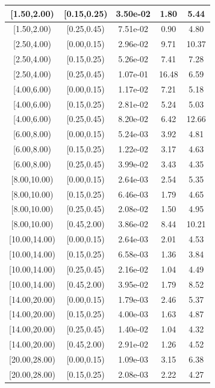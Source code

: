 \documentclass[%
aps, prd, reprint, show pacs, preprint numbers, ams math, amssymb, superscriptaddress, linenumbers]{revtex4-1}
\begin{document}
\begin{table}
\begin{tabular}{|c|c|c|c|c|}
 \hline
[1.50,2.00) & [0.15,0.25) & 3.50e-02 & 1.80 & 5.44 \\ 
 \hline
[1.50,2.00) & [0.25,0.45) & 7.51e-02 & 0.90 & 4.80 \\ 
 \hline
[2.50,4.00) & [0.00,0.15) & 2.96e-02 & 9.71 & 10.37 \\ 
 \hline
[2.50,4.00) & [0.15,0.25) & 5.26e-02 & 7.41 & 7.28 \\ 
 \hline
[2.50,4.00) & [0.25,0.45) & 1.07e-01 & 16.48 & 6.59 \\ 
 \hline
[4.00,6.00) & [0.00,0.15) & 1.17e-02 & 7.21 & 5.18 \\ 
 \hline
[4.00,6.00) & [0.15,0.25) & 2.81e-02 & 5.24 & 5.03 \\ 
 \hline
[4.00,6.00) & [0.25,0.45) & 8.20e-02 & 6.42 & 12.66 \\ 
 \hline
[6.00,8.00) & [0.00,0.15) & 5.24e-03 & 3.92 & 4.81 \\ 
 \hline
[6.00,8.00) & [0.15,0.25) & 1.22e-02 & 3.17 & 4.63 \\ 
 \hline
[6.00,8.00) & [0.25,0.45) & 3.99e-02 & 3.43 & 4.35 \\ 
 \hline
[8.00,10.00) & [0.00,0.15) & 2.64e-03 & 2.54 & 5.35 \\ 
 \hline
[8.00,10.00) & [0.15,0.25) & 6.46e-03 & 1.79 & 4.65 \\ 
 \hline
[8.00,10.00) & [0.25,0.45) & 2.08e-02 & 1.50 & 4.95 \\ 
 \hline
[8.00,10.00) & [0.45,2.00) & 3.86e-02 & 8.44 & 10.21 \\ 
 \hline
[10.00,14.00) & [0.00,0.15) & 2.64e-03 & 2.01 & 4.53 \\ 
 \hline
[10.00,14.00) & [0.15,0.25) & 6.58e-03 & 1.36 & 3.84 \\ 
 \hline
[10.00,14.00) & [0.25,0.45) & 2.16e-02 & 1.04 & 4.49 \\ 
 \hline
[10.00,14.00) & [0.45,2.00) & 3.95e-02 & 1.79 & 8.52 \\ 
 \hline
[14.00,20.00) & [0.00,0.15) & 1.79e-03 & 2.46 & 5.37 \\ 
 \hline
[14.00,20.00) & [0.15,0.25) & 4.00e-03 & 1.63 & 4.87 \\ 
 \hline
[14.00,20.00) & [0.25,0.45) & 1.40e-02 & 1.04 & 4.32 \\ 
 \hline
[14.00,20.00) & [0.45,2.00) & 2.91e-02 & 1.26 & 4.52 \\ 
 \hline
[20.00,28.00) & [0.00,0.15) & 1.09e-03 & 3.15 & 6.38 \\ 
 \hline
[20.00,28.00) & [0.15,0.25) & 2.08e-03 & 2.22 & 4.27 \\ 

\end{tabular}
\end{table}
\end{document}
